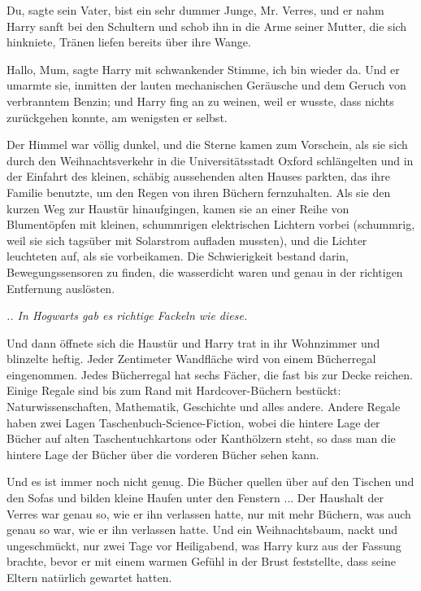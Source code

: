 \glqq{}Du\grqq{}, sagte sein Vater, \glqq{}bist ein sehr dummer Junge, Mr.
Verres\grqq{}, und er nahm Harry sanft bei den Schultern und schob ihn in die
Arme seiner Mutter, die sich hinkniete, Tränen liefen bereits über ihre Wange.

\glqq{}Hallo, Mum\grqq{}, sagte Harry mit schwankender Stimme, \glqq{}ich bin
wieder da.\grqq{} Und er umarmte sie, inmitten der lauten mechanischen Geräusche und
dem Geruch von verbranntem Benzin; und Harry fing an zu weinen, weil er wusste,
dass nichts zurückgehen konnte, am wenigsten er selbst.

Der Himmel war völlig dunkel, und die Sterne kamen zum Vorschein, als sie sich
durch den Weihnachtsverkehr in die Universitätsstadt Oxford schlängelten und in
der Einfahrt des kleinen, schäbig aussehenden alten Hauses parkten, das ihre
Familie benutzte, um den Regen von ihren Büchern fernzuhalten. Als sie den
kurzen Weg zur Haustür hinaufgingen, kamen sie an einer Reihe von Blumentöpfen
mit kleinen, schummrigen elektrischen Lichtern vorbei (schummrig, weil sie sich
tagsüber mit Solarstrom aufladen mussten), und die Lichter leuchteten auf, als
sie vorbeikamen. Die Schwierigkeit bestand darin, Bewegungssensoren zu finden,
die wasserdicht waren und genau in der richtigen Entfernung auslösten.

\emph{.. In Hogwarts gab es richtige Fackeln wie diese.}

Und dann öffnete sich die Haustür und Harry trat in ihr Wohnzimmer und blinzelte
heftig. Jeder Zentimeter Wandfläche wird von einem Bücherregal eingenommen.
Jedes Bücherregal hat sechs Fächer, die fast bis zur Decke reichen. Einige
Regale sind bis zum Rand mit Hardcover-Büchern bestückt: Naturwissenschaften,
Mathematik, Geschichte und alles andere. Andere Regale haben zwei Lagen
Taschenbuch-Science-Fiction, wobei die hintere Lage der Bücher auf alten
Taschentuchkartons oder Kanthölzern steht, so dass man die hintere Lage der
Bücher über die vorderen Bücher sehen kann.

Und es ist immer noch nicht genug. Die Bücher quellen über auf den Tischen und
den Sofas und bilden kleine Haufen unter den Fenstern ... Der Haushalt der Verres
war genau so, wie er ihn verlassen hatte, nur mit mehr Büchern, was auch genau
so war, wie er ihn verlassen hatte. Und ein Weihnachtsbaum, nackt und
ungeschmückt, nur zwei Tage vor Heiligabend, was Harry kurz aus der Fassung
brachte, bevor er mit einem warmen Gefühl in der Brust feststellte, dass seine
Eltern natürlich gewartet hatten.

